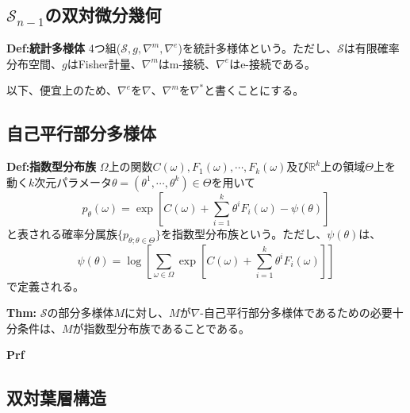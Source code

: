 \documentclass[a4paper,11pt]{jsarticle}
\numberwithin{equation}{section}
\begin{document}
\subsection{$\mathcal{S}_{n-1}$の双対微分幾何}

\begin{itembox}[l]{\textbf{Def:統計多様体}}
    4つ組($\mathcal{S},g,\nabla^{m},\nabla^{e}$)を統計多様体という。ただし、$\mathcal{S}$は有限確率分布空間、$g$はFisher計量、$\nabla^{m}$はm-接続、$\nabla^{e}$はe-接続である。
\end{itembox}
以下、便宜上のため、$\nabla^{e}$を$\nabla$、$\nabla^{m}$を$\nabla^*$と書くことにする。\\


\subsection{自己平行部分多様体}
\begin{itembox}[l]{\textbf{Def:指数型分布族}}
    $\Omega$上の関数$C(\omega),F_1(\omega),\cdots,F_k(\omega)$及び$\mathbb{R}^k$上の領域$\Theta$上を動く$k$次元パラメータ$\theta = (\theta^1,\cdots,\theta^k) \in \Theta$を用いて
    \begin{equation}
        p_{\theta}(\omega) = \exp\left[ C(\omega) + \sum_{i=1}^{k} \theta^i F_i(\omega) - \psi(\theta) \right]
    \end{equation}
    と表される確率分属族$\{p_{\theta;\theta \in \Theta}\}$を指数型分布族という。ただし、$\psi(\theta)$は、
    \begin{equation}
        \psi(\theta) = \log \left[ \sum_{\omega \in \Omega} \exp\left[ C(\omega) + \sum_{i=1}^{k} \theta^i F_i(\omega) \right] \right]
    \end{equation}
    で定義される。  

\end{itembox}

\begin{itembox}[l]{\textbf{Thm:}}
    $\mathcal{S}$の部分多様体$M$に対し、$M$が$\nabla$-自己平行部分多様体であるための必要十分条件は、$M$が指数型分布族であることである。
\end{itembox}
\textbf{Prf}\\

\subsection{双対葉層構造}
\end{document}
